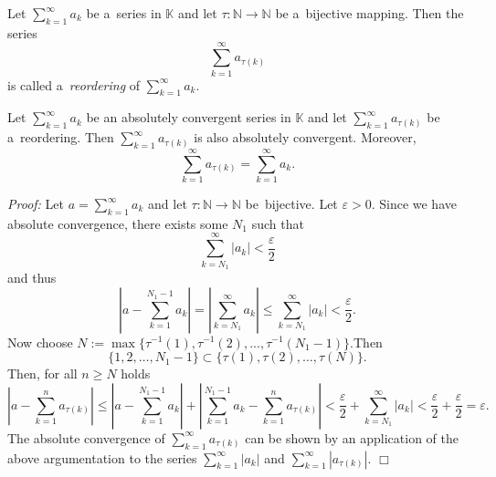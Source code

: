 

\begin{Definition}[Reordering]
 Let $\sum_{k=1}^\infty a_k$ be a~series in $\mathbb{K}$ and let $\tau:\mathbb{N}\to\mathbb{N}$ be a~bijective mapping. Then the series
\[\sum_{k=1}^\infty a_{\tau(k)}\]
is called a~\emph{reordering} of $\sum_{k=1}^\infty a_k$.
\end{Definition}

\begin{Theorem}
Let $\sum_{k=1}^\infty a_k$ be an absolutely convergent series in  $\mathbb{K}$ and let $\sum_{k=1}^\infty a_{\tau(k)}$ be a~reordering. Then $\sum_{k=1}^\infty a_{\tau(k)}$ is also absolutely convergent. Moreover,
\[\sum_{k=1}^\infty a_{\tau(k)}=\sum_{k=1}^\infty a_{k}.\]
\end{Theorem}

{\em Proof:} Let $a=\sum_{k=1}^\infty a_k$ and let $\tau:\mathbb{N}\to\mathbb{N}$ be~bijective. Let $\varepsilon>0$. Since we have absolute convergence, there exists some $N_1$ such that
\[\sum_{k=N_1}^\infty |a_k|<\frac\varepsilon2\]
and thus
\[\left|a-\sum_{k=1}^{N_1-1} a_k\right|=\left|\sum_{k=N_1}^{\infty} a_k\right|\leq\sum_{k=N_1}^{\infty} |a_k|<\frac\varepsilon2.\]
Now choose $N:=\max\{\tau^{-1}(1),\tau^{-1}(2),...,\tau^{-1}(N_1-1)\}$.Then
\[\{1,2,\ldots,N_1-1\}\subset\{\tau(1),\tau(2),\ldots,\tau(N)\}.\]
Then, for all $n\geq N$ holds
\[\left|a-\sum_{k=1}^{n} a_{\tau(k)}\right|\leq
\left|a-\sum_{k=1}^{N_1-1} a_k\right|+\left|\sum_{k=1}^{N_1-1} a_k-\sum_{k=1}^{n} a_{\tau(k)}\right|< \frac\varepsilon2+\sum_{k=N_1}^{\infty} |a_k|<\frac\varepsilon2+\frac\varepsilon2=\varepsilon.
\]
The absolute convergence of $\sum_{k=1}^\infty a_{\tau(k)}$ can be shown by an application of the above argumentation to the series $\sum_{k=1}^\infty |a_k|$ and $\sum_{k=1}^\infty |a_{\tau(k)}|$.
\hfill$\Box$

